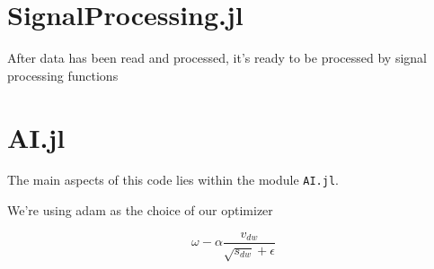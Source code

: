 




\section{SignalProcessing.jl}

After data has been read and processed, it's ready to be processed by signal processing functions 

\section{AI.jl}

The main aspects of this code lies within the module \texttt{AI.jl}. 






We're using \acrfull{adam} as the choice of our optimizer

\begin{equation}
    \omega - \alpha \frac{v_{dw}}  {\sqrt{s_{dw}} + \epsilon}
\end{equation}


